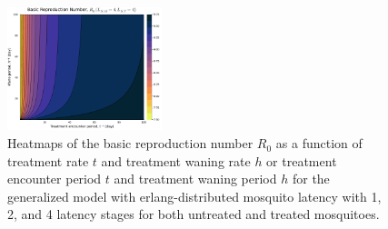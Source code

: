 \documentclass[11pt]{article}
\begin{document}
\begin{figure}[H]
  \includegraphics[width=0.4\textwidth]{../../fig/R0_periods_txh_4x4_uncal.pdf}
  \caption{Heatmaps of the basic reproduction number $R_0$ as a function of treatment rate $t$ and treatment waning rate $h$ or treatment encounter period $t$ and treatment waning period $h$ for the generalized model with erlang-distributed mosquito latency with 1, 2, and 4 latency stages for both untreated and treated mosquitoes.}
\end{figure}
\end{document}
